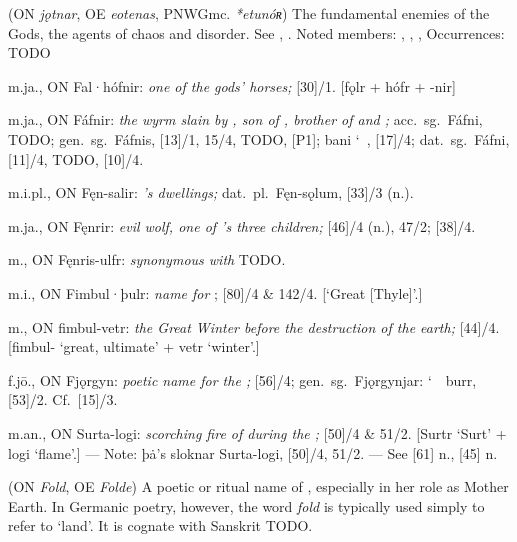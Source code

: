 \begin{itemize}
 (ON \emph{jǫtnar}, OE \emph{eotenas}, PNWGmc. \emph{*etunóʀ})
  The fundamental enemies of the Gods, the agents of chaos and disorder. See , .
  Noted members: , , , 
  Occurrences: TODO

 m.ja., ON Fal·hófnir:
  \emph{one of the gods’ horses;} [30]/1.
  [fǫlr + hófr + -nir]

 m.ja., ON Fáfnir:
  \emph{the wyrm slain by , son of , brother of  and ;} acc.~sg.~Fáfni, TODO; gen.~sg.~Fáfnis, [13]/1, 15/4, TODO, [P1]; bani \char`~, [17]/4; dat.~sg.~Fáfni, [11]/4, TODO, [10]/4.

 m.i.pl., ON Fęn-salir:
  \emph{’s dwellings;} dat.~pl.~Fęn-sǫlum, [33]/3 (n.).

 m.ja., ON Fęnrir:
  \emph{evil wolf, one of ’s three children;} [46]/4 (n.), 47/2; [38]/4.

 m., ON Fęnris-ulfr:
  \emph{synonymous with } TODO.

 m.i., ON Fimbul·þulr:
  \emph{name for }; [80]/4 \& 142/4.
  [‘Great [Thyle]’.]

 m., ON fimbul-vetr:
  \emph{the Great Winter before the destruction of the earth;} [44]/4.
  [fimbul- ‘great, ultimate’ + vetr ‘winter’.]

 f.jō., ON Fjǫrgyn:
  \emph{poetic name for the ;} [56]/4; gen.~sg.~Fjǫrgynjar: \char`~\ burr, [53]/2.  Cf.~[15]/3.

 m.an., ON Surta-logi:
  \emph{scorching fire of  during the ;} [50]/4 \& 51/2.
  [Surtr ‘Surt’ + logi ‘flame’.]
  --- Note: þȧ’s sloknar Surta-logi, [50]/4, 51/2.
  --- See [61] n., [45] n.

 (ON \emph{Fold}, OE \emph{Folde})
  A poetic or ritual name of , especially in her role as Mother Earth.  In Germanic poetry, however, the word \emph{fold} is typically used simply to refer to ‘land’.  It is cognate with Sanskrit TODO.


\end{itemize}
